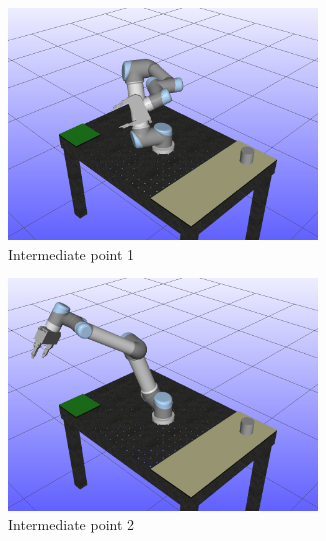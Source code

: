 \documentclass[../main.tex]{subfiles}
\begin{document}
\begin{figure}[H]
\begin{subfigure}[t]{0.3\textwidth}
        \includegraphics[width=0.9\textwidth]{figures/p2p_interpolation/intermediate1.png}
        \caption{Intermediate point 1}
        \label{}
    \end{subfigure}
    \begin{subfigure}[t]{0.3\textwidth}
        \centering
        \captionsetup{width=.9\textwidth}
        \includegraphics[width=0.9\textwidth]{figures/p2p_interpolation/intermediate2.png}
        \caption{Intermediate point 2}
        \label{}
    \end{subfigure}
    \begin{subfigure}[t]{0.3\textwidth}
        \centering
        \captionsetup{width=.9\textwidth}

\end{subfigure}
\end{figure}
\end{document}
